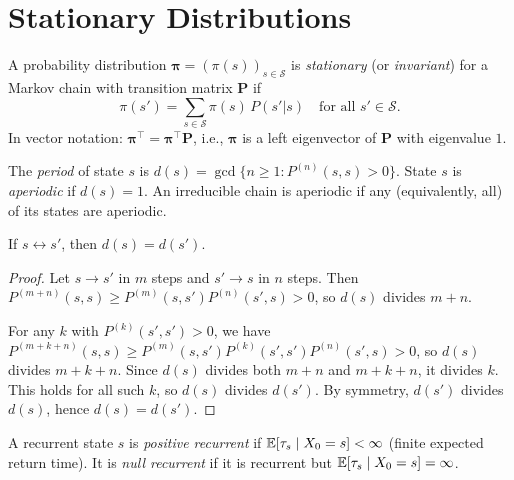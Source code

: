 \documentclass[11pt,a4paper]{article}
\begin{document}

\section{Stationary Distributions}
\label{sec:stationary}

\begin{definition}
\label{def:stationary}
A probability distribution
$\boldsymbol{\pi} = (\pi(s))_{s \in \mathcal{S}}$ is
\emph{stationary} (or \emph{invariant}) for a Markov chain with
transition matrix $\mathbf{P}$ if
\begin{equation}
  \pi(s') = \sum_{s \in \mathcal{S}} \pi(s)\, P(s'|s)
  \quad \text{for all } s' \in \mathcal{S}.
  \label{eq:stationary}
\end{equation}
In vector notation:
$\boldsymbol{\pi}^\top = \boldsymbol{\pi}^\top \mathbf{P}$,
i.e., $\boldsymbol{\pi}$ is a left eigenvector of $\mathbf{P}$
with eigenvalue $1$.
\end{definition}

\begin{definition}
\label{def:aperiodic}
The \emph{period} of state $s$ is
$d(s) = \gcd\{n \geq 1 : P^{(n)}(s, s) > 0\}$.
State $s$ is \emph{aperiodic} if $d(s) = 1$.  An irreducible
chain is aperiodic if any (equivalently, all) of its states are
aperiodic.
\end{definition}

\begin{proposition}
\label{prop:period_class}
If $s \leftrightarrow s'$, then $d(s) = d(s')$.
\end{proposition}

\begin{proof}
Let $s \to s'$ in $m$ steps and $s' \to s$ in $n$ steps.
Then $P^{(m+n)}(s, s) \geq P^{(m)}(s, s') P^{(n)}(s', s) > 0$,
so $d(s)$ divides $m + n$.

For any $k$ with $P^{(k)}(s', s') > 0$, we have
$P^{(m+k+n)}(s, s) \geq P^{(m)}(s, s') P^{(k)}(s', s')
P^{(n)}(s', s) > 0$, so $d(s)$ divides $m + k + n$.  Since
$d(s)$ divides both $m + n$ and $m + k + n$, it divides $k$.
This holds for all such $k$, so $d(s)$ divides $d(s')$.
By symmetry, $d(s')$ divides $d(s)$, hence $d(s) = d(s')$.
\end{proof}

\begin{definition}
\label{def:positive_recurrent}
A recurrent state $s$ is \emph{positive recurrent} if
$\mathbb{E}[\tau_s \mid X_0 = s] < \infty$ (finite expected return
time).  It is \emph{null recurrent} if it is recurrent but
$\mathbb{E}[\tau_s \mid X_0 = s] = \infty$.
\end{definition}
\end{document}
